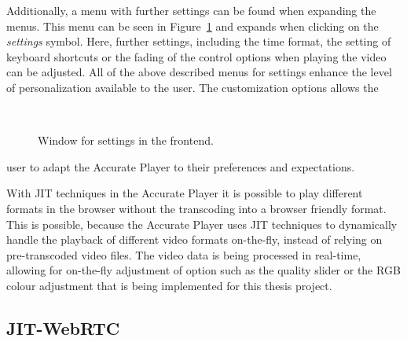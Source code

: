 \documentclass[../MasterThesis.tex]{subfiles}
\begin{document}
\begin{minipage}{0.45\textwidth}
	
Additionally, a menu with further settings can be found when expanding the menus. This menu can be seen in Figure~\ref{figure:othercontrols} and expands when clicking on the \textit{settings} symbol. Here, further settings, including the time format, the setting of keyboard shortcuts or the fading of the control options when playing the video can be adjusted. All of the above described menus for settings enhance the level of personalization available to the user. The customization options allows the 
%
%
\end{minipage}\begin{minipage}{0.05\textwidth}
	\ 
\end{minipage}\begin{minipage}{0.5\textwidth}
%
%
\begin{figure}[H]
	\begin{center}
		\caption[Window for settings in the frontend.]{Window for settings in the frontend.}
		\label{figure:othercontrols}
	\end{center}
\end{figure}
\vfill
\end{minipage}
%

user to adapt the Accurate Player to their preferences and expectations. 


With JIT techniques in the Accurate Player it is possible to play different formats in the browser without the transcoding into a browser friendly format.
This is possible, because the Accurate Player uses JIT techniques to dynamically handle the playback of different video formats on-the-fly, instead of relying on pre-transcoded video files. The video data is being processed in real-time, allowing for on-the-fly adjustment of option such as the quality slider or the RGB colour adjustment that is being implemented for this thesis project.









\subsection{JIT-WebRTC} \label{subsection:jit-webrtc}
\end{document}
